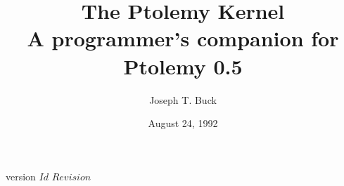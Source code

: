 \comment version $Id$ $Revision$
\title{The Ptolemy Kernel \\
A programmer's companion for Ptolemy 0.5 }
\date{August 24, 1992}
\author{Joseph T. Buck}
